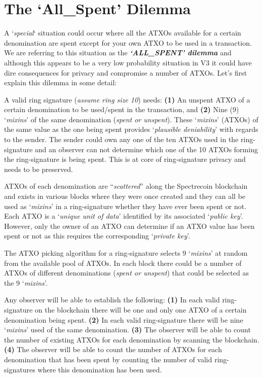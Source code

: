 \section{The ‘All\_Spent’ Dilemma}
A ‘\textit{special}‘ situation could occur where all the ATXOs available for a 
certain denomination are spent except for your own ATXO to be used in a transaction. 
We are referring to this situation as the \textbf{\textit{‘ALL\_SPENT’ dilemma}} 
and although this appears to be a very low probability situation in V3 it could 
have dire consequences for privacy and compromise a number of ATXOs. Let’s first 
explain this dilemma in some detail: 

 

A valid ring signature (\textit{assume ring size 10}) needs: \textbf{(1)} An 
unspent ATXO of a certain denomination to be used/spent in the transaction, 
and \textbf{(2)} Nine (9) ‘\textit{mixins}’ of the same denomination 
(\textit{spent or unspent}). These ‘\textit{mixins}’ (ATXOs) of the same 
value as the one being spent provides ‘\textit{plausible deniability}’ with 
regards to the sender. The sender could own any one of the ten ATXOs used 
in the ring-signature and an observer can not determine which one of the 
10 ATXOs forming the ring-signature is being spent. This is at core of 
ring-signature privacy and needs to be preserved. 

 

ATXOs of each denomination are “\textit{scattered}” along the Spectrecoin 
blockchain and exists in various blocks where they were once created and 
they can all be used as ‘\textit{mixins}’ in a ring-signature whether they 
have ever been spent or not. Each ATXO is a ‘\textit{unique unit of data}’ 
identified by its associated ‘\textit{public key}’. However, only the 
owner of an ATXO can determine if an ATXO value has been spent or not 
as this requires the corresponding ‘\textit{private key}’. 



The ATXO picking algorithm for a ring-signature selects 9 ‘\textit{mixins}’ 
at random from the available pool of ATXOs. In each block there could be a 
number of ATXOs of different denominations (\textit{spent or unspent}) 
that could be selected as the 9 ‘\textit{mixins}’. 

 

Any observer will be able to establish the following: \textbf{(1)} In each 
valid ring-signature on the blockchain there will be one and only one ATXO 
of a certain denomination being spent. \textbf{(2)} In each valid 
ring-signature there will be nine ‘\textit{mixins}’ used of the same 
denomination. \textbf{(3)} The observer will be able to count the number 
of existing ATXOs for each denomination by scanning the blockchain. 
\textbf{(4)} The observer will be able to count the number of ATXOs for 
each denomination that has been spent by counting the number of valid 
ring-signatures where this denomination has been used. 

